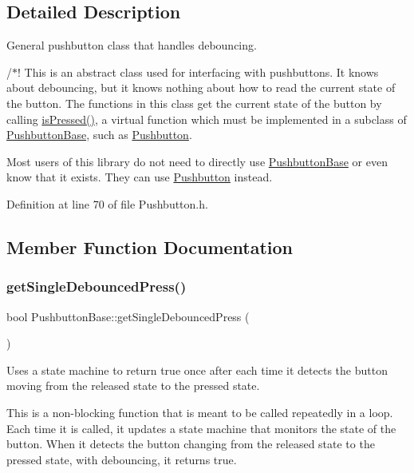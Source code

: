 \subsection{Detailed Description}
General pushbutton class that handles debouncing. 

/$\ast$! This is an abstract class used for interfacing with pushbuttons. It knows about debouncing, but it knows nothing about how to read the current state of the button. The functions in this class get the current state of the button by calling \hyperlink{class_pushbutton_base_a5b11851f15413140b75e4574e773b6ae}{is\+Pressed()}, a virtual function which must be implemented in a subclass of \hyperlink{class_pushbutton_base}{Pushbutton\+Base}, such as \hyperlink{class_pushbutton}{Pushbutton}.

Most users of this library do not need to directly use \hyperlink{class_pushbutton_base}{Pushbutton\+Base} or even know that it exists. They can use \hyperlink{class_pushbutton}{Pushbutton} instead. 

Definition at line 70 of file Pushbutton.\+h.



\subsection{Member Function Documentation}
\mbox{\label{class_pushbutton_base_a93953875c8b1c5f69dec3984774de296}} 
\subsubsection{\texorpdfstring{get\+Single\+Debounced\+Press()}{getSingleDebouncedPress()}}
{\footnotesize\ttfamily bool Pushbutton\+Base\+::get\+Single\+Debounced\+Press (\begin{DoxyParamCaption}{ }\end{DoxyParamCaption})}



Uses a state machine to return true once after each time it detects the button moving from the released state to the pressed state. 

This is a non-\/blocking function that is meant to be called repeatedly in a loop. Each time it is called, it updates a state machine that monitors the state of the button. When it detects the button changing from the released state to the pressed state, with debouncing, it returns true. 

